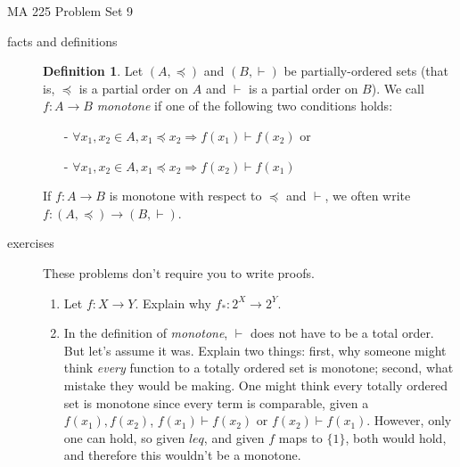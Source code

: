 \documentclass[11pt]{letter}
\theoremstyle{definition}
\newtheorem{definition}{Definition}
\begin{document}
\pagestyle{empty}

{\Large MA 225 Problem Set 9}\\


\begin{description}

\item[facts and definitions]
	\begin{definition}
		Let $(A,\preceq)$ and $(B,\vdash)$ be partially-ordered sets (that is, $\preceq$ is a partial order on $A$ and $\vdash$ is a partial order on $B$). We call $f:A\rightarrow B$ {\em monotone} if one of the following two conditions holds: 
			\begin{itemize}
				\item[-] $\forall x_1,x_2\in A, x_1\preceq x_2\Rightarrow f(x_1)\vdash f(x_2)$ or
				\item[-] $\forall x_1,x_2\in A, x_1\preceq x_2\Rightarrow f(x_2)\vdash f(x_1)$
			\end{itemize}
		If $f:A\rightarrow B$ is monotone with respect to $\preceq$ and $\vdash$, we often write $f:(A,\preceq)\rightarrow (B,\vdash)$.
	\end{definition}

\item[exercises] These problems don't require you to write proofs.
	\begin{enumerate}
		\item Let $f:X\rightarrow Y$. Explain why $f_*:2^X\rightarrow 2^Y$. 
		\item In the definition of {\em monotone}, $\vdash$ does not have to be a total order. But let's assume it was. Explain two things: first, why someone might think {\em every} function to a totally ordered set is monotone; second, what mistake they would be making. One might think every totally ordered set is monotone since every term is comparable, given a $f(x_1),f(x_2)$, $f(x_1)\vdash f(x_2)$ or $f(x_2)\vdash f(x_1)$. However, only one can hold, so given $leq$, and given $f$ maps to $\{1\}$, both would hold, and therefore this wouldn't be a monotone. 
	\end{enumerate}\bigskip


\end{description}
\end{document}
